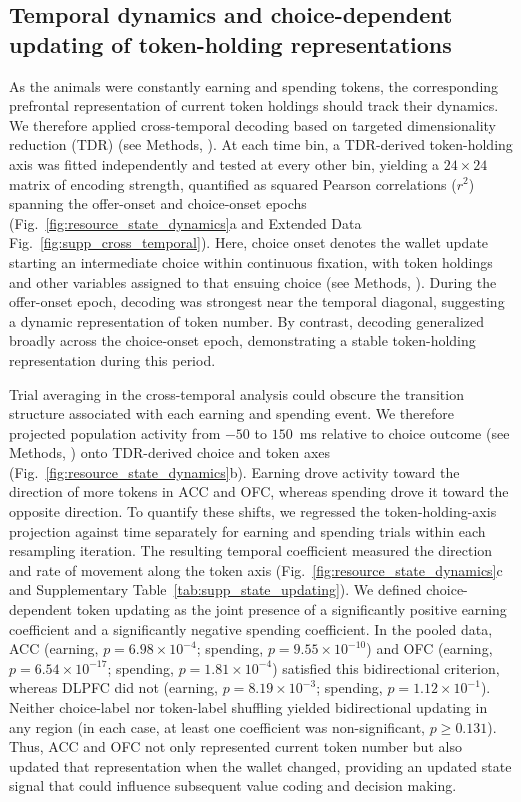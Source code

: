 \documentclass[pdflatex,sn-mathphys-num]{sn-jnl}%
\begin{document}
\subsection{Temporal dynamics and choice-dependent updating of token-holding representations}
As the animals were constantly earning and spending tokens, the corresponding prefrontal representation of current token holdings should track their dynamics. We therefore applied cross-temporal decoding based on targeted dimensionality reduction (TDR) \cite{mante2013context} (see Methods, ). At each time bin, a TDR-derived token-holding axis was fitted independently and tested at every other bin, yielding a $24 \times 24$ matrix of encoding strength, quantified as squared Pearson correlations ($r^2$) spanning the offer-onset and choice-onset epochs (Fig.~\ref{fig:resource_state_dynamics}a and Extended Data Fig.~\ref{fig:supp_cross_temporal}). Here, choice onset denotes the wallet update starting an intermediate choice within continuous fixation, with token holdings and other variables assigned to that ensuing choice (see Methods, ). During the offer-onset epoch, decoding was strongest near the temporal diagonal, suggesting a dynamic representation of token number. By contrast, decoding generalized broadly across the choice-onset epoch, demonstrating a stable token-holding representation during this period.

Trial averaging in the cross-temporal analysis could obscure the transition structure associated with each earning and spending event. We therefore projected population activity from $-50$ to $150$~ms relative to choice outcome (see Methods, ) onto TDR-derived choice and token axes (Fig.~\ref{fig:resource_state_dynamics}b). Earning drove activity toward the direction of more tokens in ACC and OFC, whereas spending drove it toward the opposite direction. To quantify these shifts, we regressed the token-holding-axis projection against time separately for earning and spending trials within each resampling iteration. The resulting temporal coefficient measured the direction and rate of movement along the token axis (Fig.~\ref{fig:resource_state_dynamics}c and Supplementary Table~\ref{tab:supp_state_updating}). We defined choice-dependent token updating as the joint presence of a significantly positive earning coefficient and a significantly negative spending coefficient. In the pooled data, ACC (earning, $p=6.98\times10^{-4}$; spending, $p=9.55\times10^{-10}$) and OFC (earning, $p=6.54\times10^{-17}$; spending, $p=1.81\times10^{-4}$) satisfied this bidirectional criterion, whereas DLPFC did not (earning, $p=8.19\times10^{-3}$; spending, $p=1.12\times10^{-1}$). Neither choice-label nor token-label shuffling yielded bidirectional updating in any region (in each case, at least one coefficient was non-significant, $p\geq0.131$). Thus, ACC and OFC not only represented current token number but also updated that representation when the wallet changed, providing an updated state signal that could influence subsequent value coding and decision making.
\end{document}
